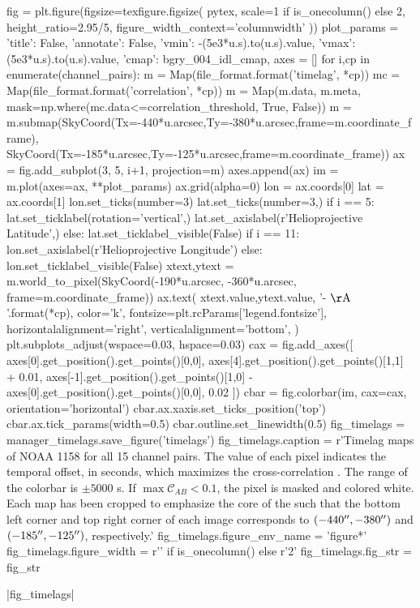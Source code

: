 \begin{pycode}
fig = plt.figure(figsize=texfigure.figsize(
    pytex,
    scale=1 if is_onecolumn() else 2,
    height_ratio=2.95/5,
    figure_width_context='columnwidth'
))
plot_params = {
    'title': False, 
    'annotate': False,
    'vmin': -(5e3*u.s).to(u.s).value,
    'vmax': (5e3*u.s).to(u.s).value,
    'cmap': bgry_004_idl_cmap,
}
axes = []
for i,cp in enumerate(channel_pairs):
    m = Map(file_format.format('timelag', *cp))
    mc = Map(file_format.format('correlation', *cp))
    m = Map(m.data, m.meta, mask=np.where(mc.data<=correlation_threshold, True, False))
    m = m.submap(SkyCoord(Tx=-440*u.arcsec,Ty=-380*u.arcsec,frame=m.coordinate_frame),
                 SkyCoord(Tx=-185*u.arcsec,Ty=-125*u.arcsec,frame=m.coordinate_frame))
    ax = fig.add_subplot(3, 5, i+1, projection=m)
    axes.append(ax)
    im = m.plot(axes=ax, **plot_params)
    ax.grid(alpha=0)
    lon = ax.coords[0]
    lat = ax.coords[1]
    lon.set_ticks(number=3)
    lat.set_ticks(number=3,) 
    if i == 5:
        lat.set_ticklabel(rotation='vertical',)
        lat.set_axislabel(r'Helioprojective Latitude',)
    else:
        lat.set_ticklabel_visible(False)
    if i == 11:
        lon.set_axislabel(r'Helioprojective Longitude')
    else:
        lon.set_ticklabel_visible(False)
    xtext,ytext = m.world_to_pixel(SkyCoord(-190*u.arcsec, -360*u.arcsec, frame=m.coordinate_frame))
    ax.text(
        xtext.value,ytext.value,
        '{}-{} $\mathrm{{\AA}}$'.format(*cp),
        color='k',
        fontsize=plt.rcParams['legend.fontsize'],
        horizontalalignment='right',
        verticalalignment='bottom',
    )
plt.subplots_adjust(wspace=0.03, hspace=0.03)
cax = fig.add_axes([
    axes[0].get_position().get_points()[0,0],
    axes[4].get_position().get_points()[1,1] + 0.01,
    axes[-1].get_position().get_points()[1,0] - axes[0].get_position().get_points()[0,0], 
    0.02
])
cbar = fig.colorbar(im, cax=cax, orientation='horizontal')
cbar.ax.xaxis.set_ticks_position('top')
cbar.ax.tick_params(width=0.5)
cbar.outline.set_linewidth(0.5)
fig_timelags = manager_timelags.save_figure('timelags')
fig_timelags.caption = r'Timelag maps of \AR{} NOAA 1158 for all 15 channel pairs. The value of each pixel indicates the temporal offset, in seconds, which maximizes the cross-correlation . The range of the colorbar is $\pm5000$ s. If $\max\mathcal{C}_{AB}<0.1$, the pixel is masked and colored white. Each map has been cropped to emphasize the core of the \AR{} such that the bottom left corner and top right corner of each image corresponds to $(-440\mbox{$^{\prime\prime}$},-380\mbox{$^{\prime\prime}$})$ and $(-185\mbox{$^{\prime\prime}$},-125\mbox{$^{\prime\prime}$})$, respectively.'
fig_timelags.figure_env_name = 'figure*'
fig_timelags.figure_width = r'\columnwidth' if is_onecolumn() else r'2\columnwidth'
fig_timelags.fig_str = fig_str
\end{pycode}
|fig_timelags|

